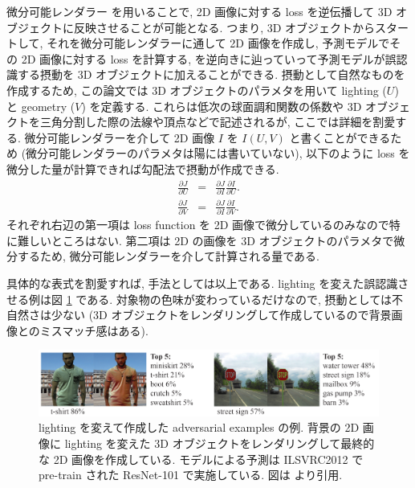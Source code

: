 微分可能レンダラー \cite{kato2018neural} を用いることで, 2D 画像に対する loss を逆伝播して 3D オブジェクトに反映させることが可能となる.
つまり, 3D オブジェクトからスタートして, それを微分可能レンダラーに通して 2D 画像を作成し, 予測モデルでその 2D 画像に対する loss を計算する, を逆向きに辿っていって予測モデルが誤認識する摂動を 3D オブジェクトに加えることができる.
摂動として自然なものを作成するため, この論文では 3D オブジェクトのパラメタを用いて lighting ($U$) と geometry ($V$) を定義する.
これらは低次の球面調和関数の係数や 3D オブジェクトを三角分割した際の法線や頂点などで記述されるが, ここでは詳細を割愛する.
微分可能レンダラーを介して 2D 画像 $I$ を $I(U, V)$ と書くことができるため (微分可能レンダラーのパラメタは陽には書いていない), 以下のように loss を微分した量が計算できれば勾配法で摂動が作成できる.
%
\begin{eqnarray}
\frac{\partial J}{\partial U} &=& \frac{\partial J}{\partial I} \frac{\partial I}{\partial U}.\\
\frac{\partial J}{\partial V} &=& \frac{\partial J}{\partial I} \frac{\partial I}{\partial V}.
\label{eq:beyond-pixel-diff}
\end{eqnarray}
%
それぞれ右辺の第一項は loss function を 2D 画像で微分しているのみなので特に難しいところはない.
第二項は 2D の画像を 3D オブジェクトのパラメタで微分するため, 微分可能レンダラーを介して計算される量である.

具体的な表式を割愛すれば, 手法としては以上である.
lighting を変えた誤認識させる例は図 \ref{fig:beyond-pixel-lighting} である.
対象物の色味が変わっているだけなので, 摂動としては不自然さは少ない (3D オブジェクトをレンダリングして作成しているので背景画像とのミスマッチ感はある).
%
\begin{figure}[htbp]
\begin{center}
\includegraphics[width=14.0cm]{figures/beyond-pixel-lighting.pdf}
\end{center}
\caption{
lighting を変えて作成した adversarial examples の例.
背景の 2D 画像に lighting を変えた 3D オブジェクトをレンダリングして最終的な 2D 画像を作成している.
モデルによる予測は ILSVRC2012 で pre-train された ResNet-101 で実施している.
図は \cite{liu2018beyond} より引用.
}
\label{fig:beyond-pixel-lighting}
\end{figure}
%


